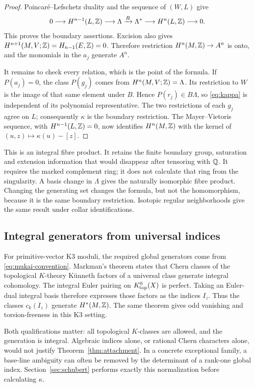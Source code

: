 \begin{proof}
Poincaré--Lefschetz duality and the sequence of \((W,L)\) give
\[
 0\longrightarrow H^{n-1}(L,\mathbb Z)\longrightarrow\Lambda
 \xrightarrow{B}\Lambda^*\longrightarrow H^n(L,\mathbb Z)
 \longrightarrow0.
\]
This proves the boundary assertions. Excision also gives
\(H^{n+1}(M,V;\mathbb Z)=H_{n-1}(E,\mathbb Z)=0\).
Therefore restriction \(H^n(M,\mathbb Z)\to A^n\) is onto, and the
monomials in the \(a_j\) generate \(A^n\).

It remains to check every relation, which is the point of the
formula. If \(P(a_j)=0\), the class \(P(g_j)\) comes from
\(H^n(M,V;\mathbb Z)=\Lambda\). Its restriction to \(W\) is the image of
that same element under \(B\). Hence \(P(r_j)\in B\Lambda\),
so \eqref{eq:kappa} is independent of its polynomial representative.
The two restrictions of each \(g_j\) agree on \(L\); consequently
\(\kappa\) is the boundary restriction. The Mayer--Vietoris sequence,
with \(H^{n-1}(L,\mathbb Z)=0\), now identifies \(H^n(M,\mathbb Z)\) with the
kernel of \((u,z)\mapsto\kappa(u)-[z]\).
\end{proof}

This is an integral fibre product. It retains the finite boundary
group, saturation and extension information that would disappear
after tensoring with \(\mathbb Q\). It requires the marked complement ring;
it does not calculate that ring from the singularity. A basis change
in \(\Lambda\) gives the naturally isomorphic fibre product.
Changing the generating set changes the formula, but not the
homomorphism, because it is the same boundary restriction.
Isotopic regular neighborhoods give the same result under collar
identifications.

\subsection{Integral generators from universal indices}
For primitive-vector K3 moduli, the required global generators come
from \eqref{eq:mukai-convention}. Markman's theorem
\cite[Theorem~1]{markman} states that Chern classes of the topological
\(K\)-theory Künneth factors of a universal class generate integral
cohomology. The integral Euler pairing on \(K^0_{\rm top}(X)\) is
perfect. Taking an Euler-dual integral basis therefore expresses
those factors as the indices \(I_z\). Thus the classes \(c_k(I_z)\)
generate \(H^*(M,\mathbb Z)\). The same theorem gives odd vanishing and
torsion-freeness in this K3 setting.

Both qualifications matter: all topological \(K\)-classes are
allowed, and the generation is integral. Algebraic indices alone,
or rational Chern characters alone, would not justify
Theorem~\ref{thm:attachment}. In a concrete exceptional family,
a base-line ambiguity can often be removed by the determinant of a
rank-one global index. Section~\ref{sec:schubert} performs exactly
this normalization before calculating \(\kappa\).


